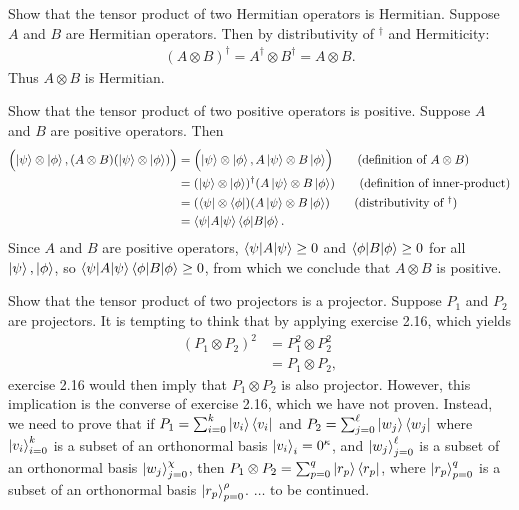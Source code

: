  Show that the tensor product of two Hermitian operators is Hermitian.
\Soln
Suppose $A$ and $B$ are Hermitian operators. Then by distributivity of $^\dagger$ and Hermiticity:
\begin{align*}
(A \otimes B)^\dagger = A^\dagger \otimes B^\dagger = A \otimes B.
\end{align*}
Thus $A \otimes B$ is Hermitian.

 Show that the tensor product of two positive operators is positive.
\Soln
Suppose $A$ and $B$ are positive operators.  Then
\begin{align*}
	\Bigl( \ket{\psi} \otimes \ket{\phi} , (A \otimes B) (\ket{\psi} \otimes \ket{\phi})\Bigr) &= \Bigl(\ket{\psi}\otimes\ket{\phi},  A\ket{\psi}\otimes B\ket{\phi}\Bigr) \tag{definition of $A\otimes B$} \\
	&= (\ket{\psi}\otimes\ket{\phi})^\dagger(A\ket{\psi}\otimes B\ket{\phi}) \tag{definition of inner-product}\\
	&=(\bra{\psi}\otimes\bra{\phi})(A\ket{\psi}\otimes B\ket{\phi}) \tag{distributivity of $^\dagger$} \\
	&= \braket{\psi |A| \psi} \braket{\phi | B | \phi}.
\end{align*}
Since $A$ and $B$ are positive operators, $\braket{\psi |A| \psi} \geq 0$ and $\braket{\phi | B | \phi} \geq 0$ for all $\ket{\psi}, \ket{\phi}$, so $\braket{\psi |A| \psi} \braket{\phi | B | \phi} \geq 0$, from which we conclude that $A \otimes B$ is positive.

 Show that the tensor product of two projectors is a projector.
\Soln
Suppose $P_1$ and $P_2$  are projectors. It is tempting to think that by applying exercise 2.16, which yields
\begin{align*}
	(P_1 \otimes P_2) ^2 &= P_1^2 \otimes P_2^2 \tag{tensor product is multiplicative}\\
		&= P_1 \otimes P_2 \tag{exercise 2.16},
\end{align*}
exercise 2.16 would then imply that $ P_1 \otimes P_2$ is also projector. However, this implication is the converse of exercise 2.16, which we have not proven.  Instead, we need to prove that if $P_1 = \sum_{i=0}^k\ket{v_i}\bra{v_i}$ and $P_2=\sum_{j=0}^\ell\ket{w_j}\bra{w_j}$ where $\ket{v_i}_{i=0}^k$ is a subset of an orthonormal basis $\ket{v_i}_i=0^{\kappa}$, and $\ket{w_j}_{j=0}^\ell$ is a subset of an orthonormal basis $\ket{w_j}_{j=0}^\chi$, then $P_1\otimes P_2 = \sum_{p=0}^q \ket{r_p}\bra{r_p}$, where $\ket{r_p}_{p=0}^{q}$ is a subset of an orthonormal basis $\ket{r_p}_{p=0}^\rho$. $\dots$ to be continued.

